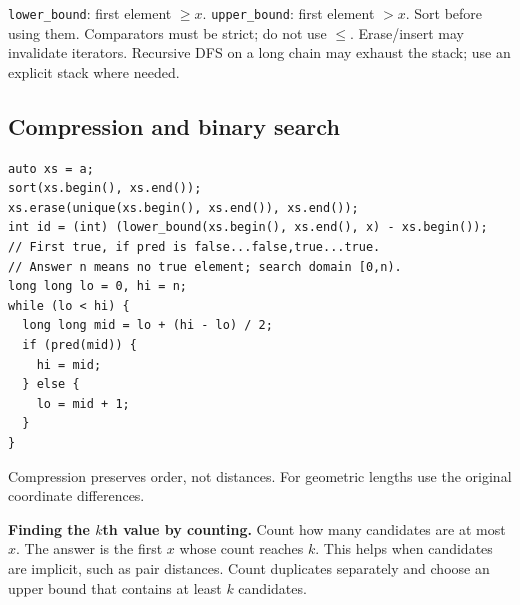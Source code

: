 \texttt{lower\_bound}: first element $\ge x$.
\texttt{upper\_bound}: first element $>x$.
Sort before using them. Comparators must be strict; do not use $\le$.
Erase/insert may invalidate iterators. Recursive DFS on a long chain may
exhaust the stack; use an explicit stack where needed.

\subsection{Compression and binary search}
\begin{lstlisting}
auto xs = a;
sort(xs.begin(), xs.end());
xs.erase(unique(xs.begin(), xs.end()), xs.end());
int id = (int) (lower_bound(xs.begin(), xs.end(), x) - xs.begin());
// First true, if pred is false...false,true...true.
// Answer n means no true element; search domain [0,n).
long long lo = 0, hi = n;
while (lo < hi) {
  long long mid = lo + (hi - lo) / 2;
  if (pred(mid)) {
    hi = mid;
  } else {
    lo = mid + 1;
  }
}
\end{lstlisting}
Compression preserves order, not distances. For geometric lengths use
the original coordinate differences.

\textbf{Finding the $k$th value by counting.} Count how many candidates are
at most $x$. The answer is the first $x$ whose count reaches $k$. This helps
when candidates are implicit, such as pair distances. Count duplicates
separately and choose an upper bound that contains at least $k$ candidates.
